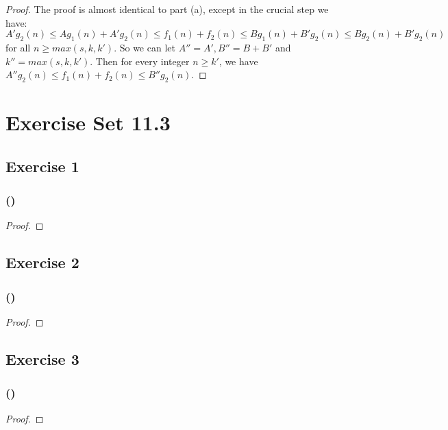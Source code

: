 \documentclass[14pt]{extarticle}
\begin{document}
\begin{proof}
The proof is almost identical to part (a), except in the crucial step we have:
\[
A'g_2(n) \leq Ag_1(n) + A'g_2(n) \leq f_1(n) + f_2(n) \leq Bg_1(n) + B'g_2(n) \leq Bg_2(n) + B'g_2(n)
\]
for all \(n \geq max(s, k, k')\). So we can let \(A'' = A', B'' = B+B'\) and \(k'' = max(s, k, k')\). Then for every
integer \(n \geq k'\), we have \(A''g_2(n) \leq f_1(n) + f_2(n) \leq B''g_2(n)\).
\end{proof}

\section{Exercise Set 11.3}

\subsection{Exercise 1}

\subsubsection{()}

\begin{proof}

\end{proof}

\subsection{Exercise 2}

\subsubsection{()}

\begin{proof}

\end{proof}

\subsection{Exercise 3}

\subsubsection{()}

\begin{proof}

\end{proof}
\end{document}
